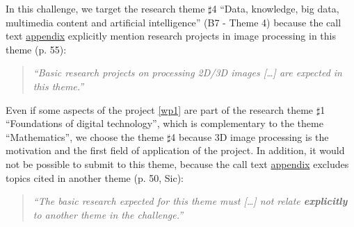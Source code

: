 
In this challenge, we target the research theme $\sharp$4 
``Data,  knowledge,  big  data,  multimedia  content  and  artificial 
intelligence'' (B7 - Theme 4) because the call text 
\href{http://www.agence-nationale-recherche.fr/fileadmin/documents/2017/ANR-Work-Programme-2018-Appendix.pdf}{appendix}
explicitly mention research projects in image processing in this theme (p. 55):
\begin{quote}\it
``Basic research projects on processing 2D/3D
images [\ldots] are expected in this theme.''
\end{quote}


Even if some aspects of the project \ref{wp1} are part of the research theme $\sharp$1
``Foundations of digital technology'', which is complementary to the theme ``Mathematics'',
we choose the theme $\sharp$4 because 3D image processing is the motivation and the
first field of application of the project. In addition, it would not be possible to
submit to this theme, because the call text
\href{http://www.agence-nationale-recherche.fr/fileadmin/documents/2017/ANR-Work-Programme-2018-Appendix.pdf}{appendix}
excludes topics cited in another theme (p. 50, Sic): 
\begin{quote}\it
``The basic research  expected  for this theme must [\ldots] not relate \textbf{explicitly}
to  another theme in the challenge.''
\end{quote}





